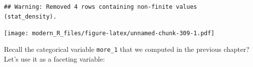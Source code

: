 \documentclass[]{gitbook}
\newenvironment{Shaded}{\begin{snugshade}}{\end{snugshade}}
\newcommand{\DataTypeTok}[1]{\textcolor[rgb]{0.13,0.29,0.53}{#1}}
\newcommand{\KeywordTok}[1]{\textcolor[rgb]{0.13,0.29,0.53}{\textbf{#1}}}
\newcommand{\NormalTok}[1]{#1}
\newcommand{\OperatorTok}[1]{\textcolor[rgb]{0.81,0.36,0.00}{\textbf{#1}}}
\newcommand{\StringTok}[1]{\textcolor[rgb]{0.31,0.60,0.02}{#1}}
\theoremstyle{definition}
\theoremstyle{definition}
\theoremstyle{definition}
\theoremstyle{remark}
\begin{document}
\begin{Shaded}
\end{Shaded}

\begin{verbatim}
## Warning: Removed 4 rows containing non-finite values (stat_density).
\end{verbatim}

\texttt{[image: modern\_R\_files/figure-latex/unnamed-chunk-309-1.pdf]}

Recall the categorical variable \texttt{more\_1} that we computed in the
previous chapter? Let's use it as a faceting variable:
\end{document}
